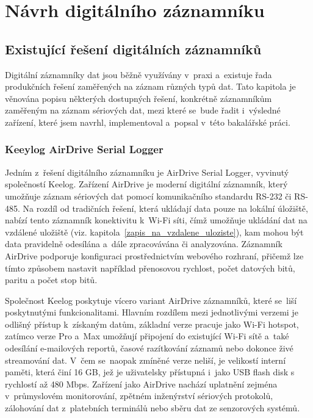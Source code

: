\chapter{Návrh digitálního záznamníku}
\label{navrh_digitalniho_zaznamniku}

\section{Existující řešení digitálních záznamníků}
\label{existujici_reseni}
Digitální záznamníky dat jsou běžně využívány v~praxi a~existuje řada produkčních řešení zaměřených na záznam různých typů dat. Tato kapitola je věnována popisu některých dostupných řešení, konkrétně záznamníkům zaměřeným na záznam sériových dat, mezi které se~bude řadit i~výsledné zařízení, které jsem navrhl, implementoval a~popsal v~této bakalářské práci. 

\subsection{Keeylog AirDrive Serial Logger}
\label{keelog_airdrive_serial_datalogger}
Jedním z~řešení digitálního záznamníku je AirDrive Serial Logger, vyvinutý společností Keelog. Zařízení AirDrive je moderní digitální záznamník, který umožňuje záznam sériových dat pomocí komunikačního standardu RS-232 či RS-485. Na rozdíl od tradičních řešení, která ukládají data pouze na lokální úložiště, nabízí tento záznamník konektivitu k~Wi-Fi síti, čímž umožňuje ukládání dat na vzdálené uložiště (viz. kapitola~\ref{zapis_na_vzdalene_uloziste}), kam mohou být data pravidelně odesílána a~dále zpracovávána či analyzována. Záznamník AirDrive podporuje konfiguraci prostřednictvím webového rozhraní, přičemž lze tímto způsobem nastavit například přenosovou rychlost, počet datových bitů, paritu a počet stop bitů.~\cite{keelog_airdrive_serial_datalogger}

Společnost Keelog poskytuje vícero variant AirDrive záznamníků, které se~liší poskytnutými funkcionalitami. Hlavním rozdílem mezi jednotlivými verzemi je odlišný přístup k~získaným datům, základní verze pracuje jako Wi-Fi hotspot, zatímco verze Pro a~Max umožňují připojení do existující Wi-Fi sítě a~také odesílání e-mailových reportů, časové razítkování záznamů nebo dokonce živé streamování dat. V~čem se~naopak zmíněné verze neliší, je velikostí interní paměti, která činí 16 GB, jež je uživatelsky přístupná i~jako USB flash disk s rychlostí až 480 Mbps. Zařízení jako AirDrive nachází uplatnění zejména v~průmyslovém monitorování, zpětném inženýrství sériových protokolů, zálohování dat z~platebních terminálů nebo sběru dat ze senzorových systémů.~\cite{keelog_airdrive_serial_datalogger}

